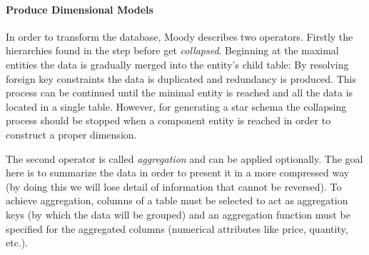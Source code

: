 \paragraph{Produce Dimensional Models}

In  order to transform the database, Moody describes two operators.
Firstly the hierarchies found in the step before get \emph{collapsed}.
Beginning at the maximal entities the data is gradually merged into the entity's child table: By resolving foreign key constraints the data is duplicated and redundancy is produced.
This process can be continued until the minimal entity is reached and all the data is located in a single table.
However, for generating a star schema the collapsing process should be stopped when a component entity is reached in order to construct a proper dimension.

The second operator is called \emph{aggregation} and can be applied optionally.
The goal here is to summarize the data in order to present it in a more compressed way (by doing this we will lose detail of information that cannot be reversed).
To achieve aggregation, columns of a table must be selected to act as aggregation keys (by which the data will be grouped) and an aggregation function must be specified for the aggregated columns (numerical attributes like price, quantity, etc.).

